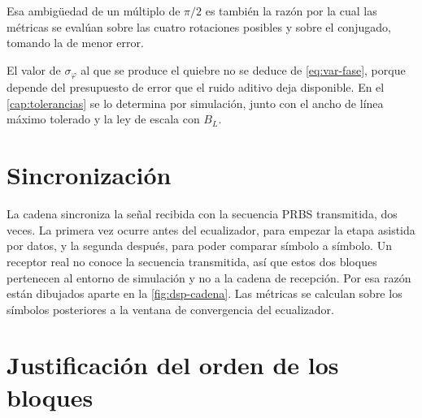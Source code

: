 Esa ambig\"uedad de un m\'ultiplo de $\pi/2$ es tambi\'en la raz\'on por la
cual las m\'etricas se eval\'uan sobre las cuatro rotaciones posibles y sobre
el conjugado, tomando la de menor error.

El valor de $\sigma_\varphi$ al que se produce el quiebre no se deduce de
\eqref{eq:var-fase}, porque depende del presupuesto de error que el ruido
aditivo deja disponible. En el \cref{cap:tolerancias} se lo determina por
simulaci\'on, junto con el ancho de l\'inea m\'aximo tolerado y la ley de
escala con $B_L$.


\section{Sincronizaci\'on}
\label{sec:dsp-decision}

La cadena sincroniza la se\~nal recibida con la secuencia PRBS transmitida,
dos veces. La primera vez ocurre antes del ecualizador, para empezar la etapa
asistida por datos, y la segunda despu\'es, para poder comparar s\'imbolo a
s\'imbolo. Un receptor real no conoce la secuencia transmitida, as\'i que
estos dos bloques pertenecen al entorno de simulaci\'on y no a la cadena de recepci\'on. Por esa raz\'on
est\'an dibujados aparte en la \cref{fig:dsp-cadena}. Las m\'etricas se
calculan sobre los s\'imbolos posteriores a la ventana de convergencia del
ecualizador.

\section{Justificaci\'on del orden de los bloques}
\label{sec:dsp-orden}

